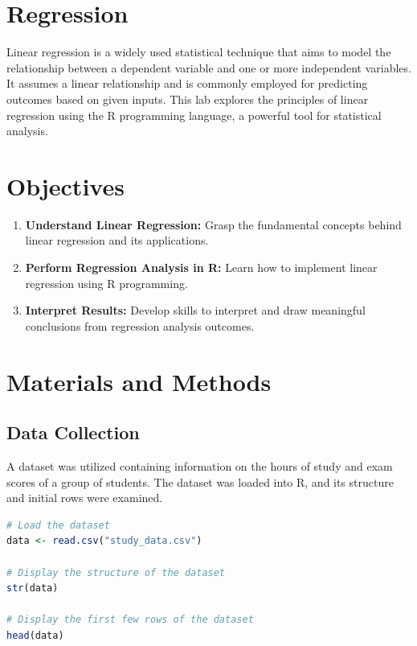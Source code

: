 \documentclass[10pt]{book}
\begin{document}
\newpage


\section{Regression}

Linear regression is a widely used statistical technique that aims to model the relationship between a dependent variable and one or more independent variables. It assumes a linear relationship and is commonly employed for predicting outcomes based on given inputs. This lab explores the principles of linear regression using the R programming language, a powerful tool for statistical analysis.

\section{Objectives}

\begin{enumerate}
    \item \textbf{Understand Linear Regression:} Grasp the fundamental concepts behind linear regression and its applications.
    \item \textbf{Perform Regression Analysis in R:} Learn how to implement linear regression using R programming.
    \item \textbf{Interpret Results:} Develop skills to interpret and draw meaningful conclusions from regression analysis outcomes.
\end{enumerate}

\section{Materials and Methods}

\subsection{Data Collection}

A dataset was utilized containing information on the hours of study and exam scores of a group of students. The dataset was loaded into R, and its structure and initial rows were examined.

\begin{lstlisting}[language=R]
# Load the dataset
data <- read.csv("study_data.csv")

# Display the structure of the dataset
str(data)

# Display the first few rows of the dataset
head(data)
\end{lstlisting}
\end{document}
